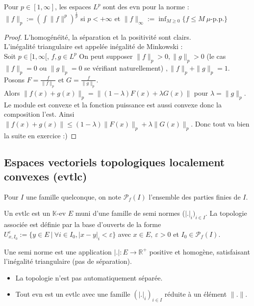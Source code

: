 \begin{proposition}
   Pour $p \in [1,\infty]$, les espaces $L^p$ sont des evn pour la norme : $\|f\|_p:=\left( \int\|f\|^p \right)^{\frac{1}{p}}$ si $p<+\infty$ et $\|f\|_\infty := \inf_{M \geq 0}\{f \leq M ~\mu \text{-p.p.}\}$ 
\end{proposition}

\begin{proof} 
    L'homogénéité, la séparation et la positivité sont clairs. \\
    L'inégalité triangulaire est appelée inégalité de Minkowski :\\
    Soit $p\in [1,\infty [$, $f,g\in L^p$ On peut supposer $\|f\|_p>0,\|g\|_p>0$ (le cas $\|f\|_p = 0$ ou $\|g\|_p=0$ se vérifiant naturellement) $, \|f\|_p+\|g\|_p=1$. Posons $F=\frac{f}{\|f\|_p}$ et $G=\frac{f}{\|g\|_p}$. \\
    Alors $\|f(x)+g(x)\|_p=\|(1-\lambda)F(x)+\lambda G(x)\|$ pour $\lambda=\|g\|_p$. Le module est convexe et la fonction puissance est aussi convexe donc la composition l'est. Ainsi $\|f(x)+g(x)\|\le (1-\lambda)\|F(x)\|_p+\lambda\|G(x)\|_p$. Donc tout va bien la suite en exercice :)
\end{proof}


\subsection{Espaces vectoriels topologiques localement convexes (evtlc)}

Pour $I$ une famille quelconque, on note $\mathcal{P}_f(I)$ l'ensemble des parties finies de $I$.

\begin{definition}
    Un evtlc est un $\mathbb{K}$-ev $E$ muni d'une famille de semi normes ($|.|_i)_{i\in I}$. La topologie associée est définie par la base d'ouverts de la forme $U_{x,I_0}^\varepsilon := \{y\in E\ |\ \forall i\in I_0, |x-y|_i<\varepsilon \} $ avec $x\in E,\ \varepsilon >0$ et $I_0\in \mathcal{P}_f(I)$.
\end{definition}

\begin{remarque}
    Une semi norme est une application $|.|:E\to \mathbb{R}^+ $ positive et homogène, satisfaisant l'inégalité triangulaire (pas de séparation).
\end{remarque}

\begin{remarque}\par\noindent
    \begin{itemize}
    \item La topologie n'est pas automatiquement séparée.
    \item Tout evn est un evtlc avec une famille $(|.|_i)_{i\in I}$ réduite à un élément $\|.\|$.
\end{itemize}
\end{remarque}


